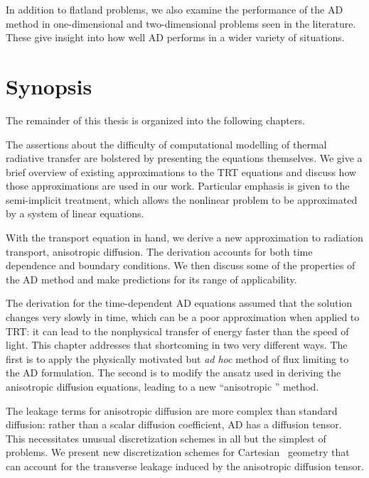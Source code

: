 In addition to flatland problems, we also examine the performance of the AD
method in one-dimensional and two-dimensional problems seen in the
literature. These give insight into how well AD performs in a wider variety of
situations.

\section{Synopsis}

The remainder of this thesis is organized into the following chapters.

The assertions about the difficulty of computational modelling of thermal
radiative transfer are bolstered by presenting the equations themselves. We give
a brief overview of existing approximations to the TRT equations and discuss how
those approximations are used in our work. Particular emphasis is given to the
semi-implicit treatment, which allows the nonlinear problem to be approximated
by a system of linear equations.

With the transport equation in hand, we derive a new approximation to radiation
transport, anisotropic diffusion. The derivation accounts for both time
dependence and boundary conditions. We then discuss some of the properties of
the AD method and make predictions for its range of applicability.

The derivation for the time-dependent AD equations assumed that the solution
changes very slowly in time, which can be a poor approximation when applied to
TRT: it can lead to the nonphysical transfer of energy faster than the speed of
light. This chapter addresses that shortcoming in two very different ways. The
first is to apply the physically motivated but \emph{ad hoc} method of flux
limiting to the AD formulation. The second is to modify the ansatz used in
deriving the anisotropic diffusion equations, leading to a new ``anisotropic
\Pone'' method.

The leakage terms for anisotropic diffusion are more complex than standard
diffusion: rather than a scalar diffusion coefficient, AD has a diffusion
tensor. This necessitates unusual discretization schemes in all but the simplest
of problems. We present new discretization schemes for Cartesian \xy\ geometry
that can account for the transverse leakage induced by the anisotropic diffusion
tensor.

